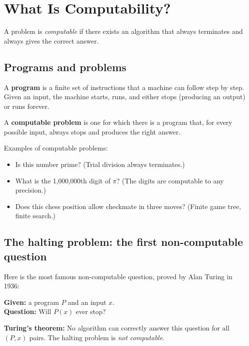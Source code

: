 \documentclass[11pt,a4paper]{article}
\newcommand{\term}[1]{\textbf{#1}}
\begin{document}
\section{What Is Computability?}
\label{sec:computability}

\begin{tcolorbox}[colback=boxblue,colframe=blue!40!black,title=The one-line answer]
A problem is \emph{computable} if there exists an algorithm that always
terminates and always gives the correct answer.
\end{tcolorbox}

\subsection{Programs and problems}

A \term{program} is a finite set of instructions that a machine can follow
step by step. Given an input, the machine starts, runs, and either stops
(producing an output) or runs forever.

A \term{computable problem} is one for which there is a program that, for
every possible input, always stops and produces the right answer.

Examples of computable problems:
\begin{itemize}
  \item Is this number prime? (Trial division always terminates.)
  \item What is the 1{,}000{,}000th digit of $\pi$? (The digits are
    computable to any precision.)
  \item Does this chess position allow checkmate in three moves? (Finite
    game tree, finite search.)
\end{itemize}

\subsection{The halting problem: the first non-computable question}

Here is the most famous non-computable question, proved by Alan Turing in 1936:

\begin{tcolorbox}[colback=boxorange,colframe=orange!60!black,
  title=The Halting Problem]
\textbf{Given:} a program $P$ and an input $x$.\\[4pt]
\textbf{Question:} Will $P(x)$ ever stop?

\medskip
\textbf{Turing's theorem:} No algorithm can correctly answer this question for
all $(P, x)$ pairs.  The halting problem is \emph{not computable}.
\end{tcolorbox}
\end{document}

